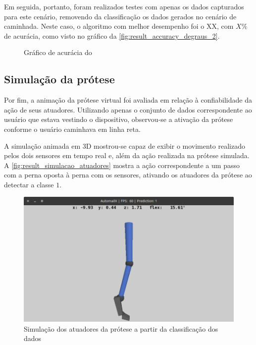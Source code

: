Em seguida, portanto, foram realizados testes com apenas os dados capturados para este cenário, removendo da classificação os dados gerados no cenário de caminhada. Neste caso, o algoritmo com melhor desempenho foi o XX, com \(X\%\) de acurácia, como visto no gráfico da \autoref{fig:result_accuracy_degraus_2}.

\begin{figure}[ht]
	\caption{\label{fig:result_accuracy_degraus_2}Gráfico de acurácia do}
	\begin{center}
	\end{center}
\end{figure}


\subsection{Simulação da prótese}
Por fim, a animação da prótese virtual foi avaliada em relação à confiabilidade da ação de seus atuadores. Utilizando apenas o conjunto de dados correspondente ao usuário que estava vestindo o dispositivo, observou-se a ativação da prótese conforme o usuário caminhava em linha reta.

A simulação animada em 3D mostrou-se capaz de exibir o movimento realizado pelos dois sensores em tempo real e, além da ação realizada na prótese simulada. A \autoref{fig:result_simulacao_atuadores} mostra a ação correspondente a um passo com a perna oposta à perna com os sensores, ativando os atuadores da prótese ao detectar a classe \(1\).

\begin{figure}[ht]
	\caption{\label{fig:result_simulacao_atuadores}Simulação dos atuadores da prótese a partir da classificação dos dados}
	\begin{center}
	    \includegraphics[width=.8\textwidth]{resources/result_simulacao_atuadores}
	\end{center}
\end{figure}